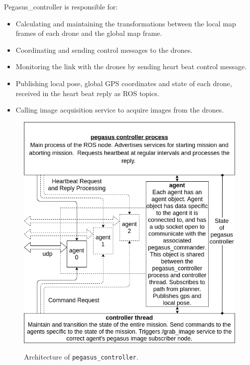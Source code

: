 Pegasus\_controller is responsible for:
\begin{itemize}
	\item Calculating and maintaining the transformations between the local map frames of each drone and the global map frame.
	\item Coordinating and sending control messages to the drones.
	\item Monitoring the link with the drones by sending heart beat control message.
	\item Publishing local pose, global GPS coordinates and state of each drone, received in the heart beat reply as ROS topics.
	\item Calling image acquisition service to acquire images from the drones.
\end{itemize}

\begin{figure}
	\centering
	\caption[Architecture of \texttt{pegasus\_controller}.]{\small Architecture of \texttt{pegasus\_controller}.}
	\includegraphics[width=5in]{figures/methodology/methodology-pegasus-controller}
	\label{fig:pegasus-controller}
\end{figure}

